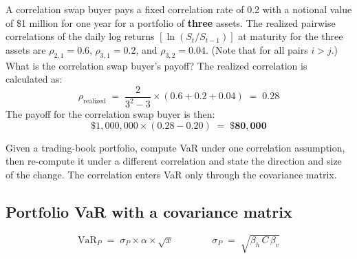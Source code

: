 \begin{mrexbox}[title={Example --- correlation swap payoff}]
A correlation swap buyer pays a fixed correlation rate of 0.2 with a notional value of
\$1 million for one year for a portfolio of \textbf{three} assets. The realized pairwise
correlations of the daily log returns $[\ln(S_t/S_{t-1})]$ at maturity for the three assets are
$\rho_{2,1} = 0.6$, $\rho_{3,1} = 0.2$, and $\rho_{3,2} = 0.04$. (Note that for all pairs
$i > j$.) What is the correlation swap buyer's payoff?
\tcblower
\small
The realized correlation is calculated as:
\[ \rho_{\text{realized}} \;=\; \frac{2}{3^2 - 3} \times (0.6 + 0.2 + 0.04) \;=\; 0.28 \]
The payoff for the correlation swap buyer is then:
\[ \$1{,}000{,}000 \times (0.28 - 0.20) \;=\; \mathbf{\$80{,}000} \]
\end{mrexbox}


\noindent\gapbadge{}\par
\vspace{6pt}

\begin{mrgapbox}[title={What the objective asks for}]
Given a trading-book portfolio, compute VaR under one correlation assumption, then re-compute it
under a different correlation and state the direction and size of the change. The correlation
enters VaR only through the covariance matrix.
\end{mrgapbox}

\subsection{Portfolio VaR with a covariance matrix}

\begin{mrfmlbox}
\[ \mathrm{VaR}_P \;=\; \sigma_P \times \alpha \times \sqrt{x}
   \qquad\qquad
   \sigma_P \;=\; \sqrt{ \beta_h \, C \, \beta_v } \]
\end{mrfmlbox}

